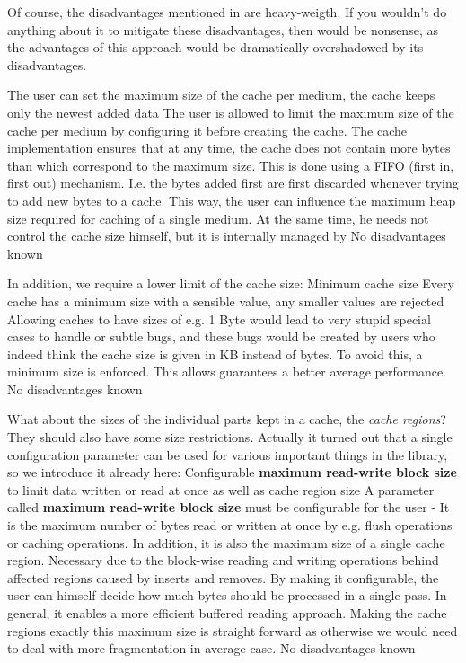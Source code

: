 Of course, the disadvantages mentioned in  are heavy-weigth. If you wouldn't do anything about it to mitigate these disadvantages, then  would be nonsense, as the advantages of this approach would be dramatically overshadowed by its disadvantages.

{%
The user can set the maximum size of the cache per medium, the cache keeps only the newest added data
}
{%
The user is allowed to limit the maximum size of the cache per medium by configuring it before creating the cache. The cache implementation ensures that at any time, the cache does not contain more bytes than which correspond to the maximum size. This is done using a FIFO (first in, first out) mechanism. I.e. the bytes added first are first discarded whenever trying to add new bytes to a cache.
}
{%
This way, the user can influence the maximum heap size required for caching of a single medium. At the same time, he needs not control the cache size himself, but it is internally managed by \COMPmedia{}
}
{%
No disadvantages known
}

In addition, we require a lower limit of the cache size:
{%
Minimum cache size
}
{%
Every cache has a minimum size with a sensible value, any smaller values are rejected
}
{%
Allowing caches to have sizes of e.g. 1 Byte would lead to very stupid special cases to handle or subtle bugs, and these bugs would be created by users who indeed think the cache size is given in KB instead of bytes. To avoid this, a minimum size is enforced. This allows guarantees a better average performance.
}
{%
No disadvantages known
}

What about the sizes of the individual parts kept in a cache, the \emph{cache regions}? They should also have some size restrictions. Actually it turned out that a single configuration parameter can be used for various important things in the library, so we introduce it already here:
{%
Configurable \textbf{maximum read-write block size} to limit data written or read at once as well as cache region size
}
{%
A parameter called \textbf{maximum read-write block size} must be configurable for the user - It is the maximum number of bytes read or written at once by e.g. flush operations or caching operations. In addition, it is also the maximum size of a single cache region.
}
{%
Necessary due to the block-wise reading and writing operations behind affected regions caused by inserts and removes. By making it configurable, the user can himself decide how much bytes should be processed in a single pass. In general, it enables a more efficient buffered reading approach. Making the cache regions exactly this maximum size is straight forward as otherwise we would need to deal with more fragmentation in average case.
}
{%
No disadvantages known
}

